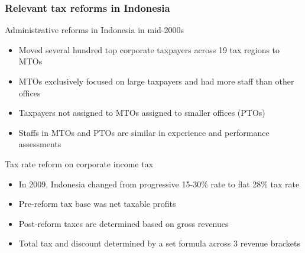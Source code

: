 \documentclass[aspectratio=169]{beamer}
\begin{document}
\begin{frame}
\frametitle{Relevant tax reforms in Indonesia}
Administrative reforms in Indonesia in mid-2000s
\begin{itemize}\setlength\itemsep{3pt}
\item Moved several hundred top corporate taxpayers across 19 tax regions to MTOs 
\item MTOs exclusively focused on large taxpayers and had more staff than other offices
\item Taxpayers not assigned to MTOs assigned to smaller offices (PTOs)
\item Staffs in MTOs and PTOs are similar in experience and performance assessments
\end{itemize}\medskip
Tax rate reform on corporate income tax
\begin{itemize}\setlength\itemsep{3pt}
\item In 2009, Indonesia changed from progressive 15-30\% rate to flat 28\% tax rate
\item Pre-reform tax base was net taxable profits
\item Post-reform taxes are determined based on gross revenues
\item Total tax and discount determined by a set formula across 3 revenue brackets
\end{itemize}
\end{frame}
\end{document}
